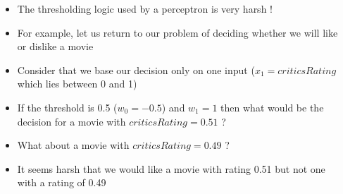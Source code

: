 \begin{frame}
	\begin{columns}
		\begin{overlayarea}{\textwidth}{\textheight}
			\begin{center}
				
			\end{center}
		\end{overlayarea}
		\begin{overlayarea}{\textwidth}{\textheight}
			\begin{itemize}\justifying
				\item<1-> The thresholding logic used by a perceptron is very harsh !
				\item<2-> For example, let us return to our problem of deciding whether we will like or dislike a movie
				\item<3-> Consider that we base our decision only on one input ($x_1 = criticsRating$ which lies between 0 and 1)
				\item<4-> If the threshold is 0.5 ($w_0 = -0.5$) and $w_1 = 1$ then what would be the decision for a movie with $criticsRating=0.51$ ? \onslide<5->{(like)}
				\item<6-> What about a movie with $criticsRating=0.49$ ? \onslide<7->{(dislike)}
				\item<8-> It seems harsh that we would like a movie with rating 0.51 but not one with a rating of 0.49
			\end{itemize}
		\end{overlayarea}
	\end{columns}
\end{frame}

